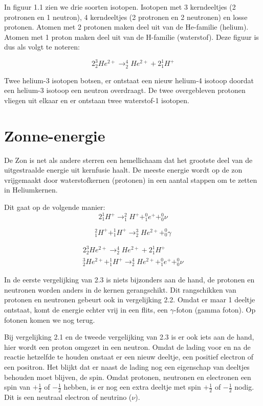 In figuur 1.1 zien we drie soorten isotopen. Isotopen met 3 kerndeeltjes
(2 protronen en 1 neutron), 4 kerndeeltjes (2 protronen en 2 neutronen)
en losse protonen. Atomen met 2 protonen maken deel uit van de He-familie
(helium). Atomen met 1 proton maken deel uit van de H-familie (waterstof).
Deze figuur is dus als volgt te noteren:

\[
2_{2}^{3}He^{2+}\rightarrow_{2}^{4}He^{2+}+2_{1}^{1}H^{+}
\]


Twee helium-3 isotopen botsen, er ontstaat een nieuw helium-4 isotoop
doordat een helium-3 isotoop een neutron overdraagt. De twee overgebleven
protonen vliegen uit elkaar en er ontstaan twee waterstof-1 isotopen.


\section{Zonne-energie}

De Zon is net als andere sterren een hemellichaam dat het grootste
deel van de uitgestraalde energie uit kernfusie haalt. De meeste energie
wordt op de zon vrijgemaakt door waterstofkernen (protonen) in een
aantal stappen om te zetten in Heliumkernen. 

Dit gaat op de volgende manier:
\begin{equation}
2_{1}^{1}H^{+}\rightarrow_{1}^{2}H^{+}+_{1}^{0}e^{+}+_{0}^{0}\nu
\end{equation}


\begin{equation}
_{1}^{2}H^{+}+_{1}^{1}H^{+}\rightarrow_{2}^{3}He^{2+}+_{0}^{0}\gamma
\end{equation}


\begin{equation}
\begin{array}{c}
2_{2}^{3}He^{2+}\rightarrow_{2}^{4}He^{2+}+2_{1}^{1}H^{+}\\
_{2}^{3}He^{2+}+_{1}^{1}H^{+}\rightarrow_{2}^{4}He^{2+}+_{1}^{0}e^{+}+_{0}^{0}\nu
\end{array}
\end{equation}
 

In de eerste vergelijking van 2.3 is niets bijzonders aan de hand,
de protonen en neutronen worden anders in de kernen gerangschikt.
Dit rangschikken van protonen en neutronen gebeurt ook in vergelijking
2.2. Omdat er maar 1 deeltje ontstaat, komt de energie echter vrij
in een flits, een $\gamma$-foton (gamma foton). Op fotonen komen
we nog terug.

Bij vergelijking 2.1 en de tweede vergelijking van 2.3 is er ook iets
aan de hand, hier wordt een proton omgezet in een neutron. Omdat de
lading voor en na de reactie hetzelfde te houden onstaat er een nieuw
deeltje, een positief electron of een positron. Het blijkt dat er
naast de lading nog een eigenschap van deeltjes behouden moet blijven,
de spin. Omdat protonen, neutronen en electronen een spin van $+\frac{1}{2}$
of $-\frac{1}{2}$ hebben, is er nog een extra deeltje met spin $+\frac{1}{2}$
of $-\frac{1}{2}$ nodig. Dit is een neutraal electron of neutrino
($\nu$).

